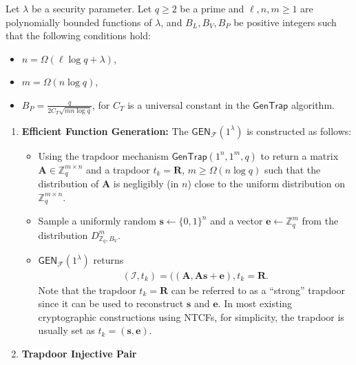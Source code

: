 \documentclass[cryptography,review,submit,pdftex,moreauthors,amsmath,amssymb,aps,strict]{Definitions/mdpi}
\begin{document}
\begin{Definition}
    Let $\lambda$ be a security parameter. Let $q\geq 2$ be a prime and $\ell,n,m\geq 1$ are polynomially bounded functions of $\lambda$, and $B_L,B_V, B_P$ be positive integers such that the following conditions hold:
    \begin{itemize}
        \item $n=\Omega(\ell\log q +\lambda)$,
        \item $m=\Omega(n\log q)$,
        \item $B_P = \displaystyle{\frac{q}{2C_T\sqrt{mn\log q}}}$, for $C_T$ is a universal constant in the $\mathsf{GenTrap}$ algorithm.
    \end{itemize}
\begin{enumerate}
    \item \textbf{Efficient Function Generation:} The $\mathsf{GEN}_{\mathcal{F}}(1^{\lambda})$ is constructed as follows:
    \begin{itemize}
        \item Using the trapdoor mechanism  $\mathsf{GenTrap}(1^n,1^m,q)$ to return a matrix $\mathbf{A}\in\mathbb{Z}^{m\times n}_q$ and a trapdoor $t_{k}=\mathbf{R}$, $m\geq \Omega (n\log q)$ such that the distribution of $\mathbf{A}$ is negligibly (in $n$) close to the uniform distribution on $\mathbb{Z}^{m\times n}_q$.
        \item Sample a uniformly random $\mathbf{s}\gets \{0,1\}^{n}$ and a vector $\mathbf{e}\gets \mathbb{Z}^m_q$ from the distribution $D^m_{\mathbb{Z}_q,B_V}$.
        \item $\mathsf{GEN}_{\mathcal{F}}(1^{\lambda})$ returns 
        \begin{align}
            (\mathcal{I},t_{k})=((\mathbf{A},\mathbf{A}\mathbf{s}+\mathbf{e}),t_{k}=\mathbf{R}.
        \end{align}
    Note that the trapdoor $t_{k}=\mathbf{R}$ can be referred to as a ``strong'' trapdoor since it can be used to reconstruct $\mathbf{s}$ and $\mathbf{e}$. In most existing cryptographic constructions using NTCFs, for simplicity, the trapdoor is usually set as $t_{k}=(\mathbf{s},\mathbf{e})$.
    \end{itemize}
    \item \textbf{Trapdoor Injective Pair}

\end{enumerate}
\end{Definition}
\end{document}
